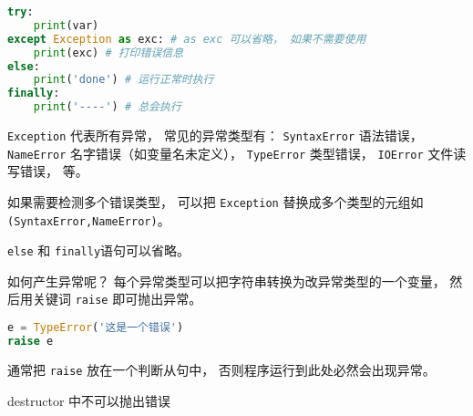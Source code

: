 
\begin{issues}
\issueDraft
\end{issues}

\begin{lstlisting}[language=python]
try:
    print(var)
except Exception as exc: # as exc 可以省略， 如果不需要使用
    print(exc) # 打印错误信息
else:
    print('done') # 运行正常时执行
finally:
    print('----') # 总会执行
\end{lstlisting}

\verb`Exception` 代表所有异常， 常见的异常类型有： \verb`SyntaxError` 语法错误， \verb`NameError` 名字错误（如变量名未定义）， \verb`TypeError` 类型错误， \verb`IOError` 文件读写错误， 等。

如果需要检测多个错误类型， 可以把 \verb`Exception` 替换成多个类型的元组如 \verb`(SyntaxError,NameError)`。

\verb`else` 和 \verb`finally`语句可以省略。

如何产生异常呢？ 每个异常类型可以把字符串转换为改异常类型的一个变量， 然后用关键词 \verb`raise` 即可抛出异常。
\begin{lstlisting}[language=python]
e = TypeError('这是一个错误')
raise e
\end{lstlisting}
通常把 \verb`raise` 放在一个判断从句中， 否则程序运行到此处必然会出现异常。

destructor 中不可以抛出错误
